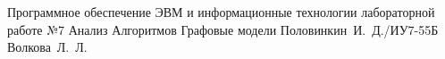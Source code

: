 \documentclass{bmstu}
\begin{document}
	
	{Программное обеспечение ЭВМ и информационные технологии}
	{лабораторной работе №7}
	{Анализ Алгоритмов}
	{Графовые модели}
	{}
	{Половинкин~И.~Д./ИУ7-55Б}
	{Волкова~Л.~Л.}
	
	\maketableofcontents
	
	
	
	
	
	
	
	
	
	\makebibliography
	
\end{document}
